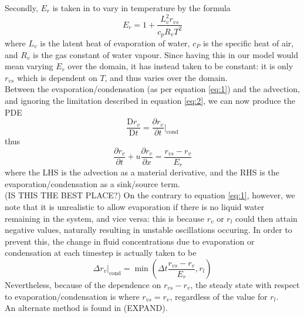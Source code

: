 \documentclass[11pt]{article}
\begin{document}
Secondly, $E_r$ is taken in \citeauthor{BF2002} to vary in temperature by the formula
\begin{equation}
E_r = 1+\frac{L_v^2r_{vs}}{c_pR_vT^2} \label{eq:condrate}
\end{equation}
where 
$L_v$ is the latent heat of evaporation of water, 
$c_P$ is the specific heat of air, 
and $R_v$ is the gas constant of water vapour. 
Since having this in our model would mean varying $E_r$ over the domain, it has instead taken to be constant: it is only $r_{vs}$ which is dependent on $T$, and thus varies over the domain. \\
Between the evaporation/condensation (as per equation \ref{eq:1}) and the advection, and ignoring the limitation described in equation \ref{eq:2}, we can now produce the PDE
\[
\frac{\text{D} r_v}{\text{D} t}=\frac{\partial r_v}{\partial t}|_{\text{cond}}
\]
thus
\begin{equation}
\frac{\partial r_v}{\partial t}+u\frac{\partial r_v}{\partial x}=\frac{r_{vs} - r_v}{E_r} \label{eq:3}
\end{equation}
where the LHS is the advection as a material derivative, and the RHS is the evaporation/condensation as a sink/source term. \\
(IS THIS THE BEST PLACE?) 
On the contrary to equation \ref{eq:1}, however, we note that it is unrealistic to allow evaporation if there is no liquid water remaining in the system, and vice versa: this is because $r_v$ or $r_l$ could then attain negative values, naturally resulting in unstable oscillations occuring. In order to prevent this, the change in fluid concentrations due to evaporation or condensation at each timestep is actually taken to be
\begin{equation} \label{eq:2}
\Delta r_v|_{\text{cond}} = \min\left(\Delta t\frac{r_{vs} - r_v}{E_r},r_l\right)
\end{equation}
Nevertheless, because of the dependence on $r_{vs} - r_v$, the steady state with respect to evaporation/condensation is where $r_{vs}=r_v$, regardless of the value for $r_l$. \\
An alternate method is found in \citet{Jaehn2015} (EXPAND). \\
\end{document}
